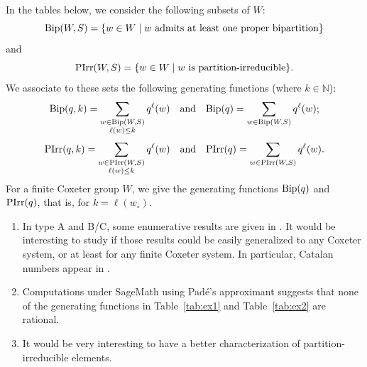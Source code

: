 \documentclass[Unicode]{cedram-alco}
\theoremstyle{definition}
\begin{document}
In the tables below, we consider the following subsets of $W$:
\newcommand{\bip}{\textnormal{Bip}}
\newcommand{\pirr}{\textnormal{PIrr}}
$$
\bip(W,S)=\{w\in W\mid w\textrm{ admits at least one proper bipartition}\}
$$
and
$$
 \pirr(W,S)=\{w\in W\mid w\textrm{ is partition-irreducible}\}.
$$
We associate to these sets the following generating functions (where $k\in\mathbb N$):
$$
\bip(q,k)=\sum_{\substack{w\in \bip(W,S)\\ \ell(w)\leq k}} q^\ell(w)\quad\textrm{and}\quad\bip(q)=\sum_{w\in \bip(W,S)} q^\ell(w);
$$
$$
\pirr(q,k)=\sum_{\substack{w\in \pirr(W,S)\\ \ell(w)\leq k}} q^\ell(w)\quad\textrm{and}\quad \pirr(q)=\sum_{w\in \pirr(W,S)} q^\ell(w).
$$
For a finite Coxeter group $W$, we give the generating functions $\bip(q)$ and $ \pirr(q)$, that is, for $k=\ell(w_\circ)$. 

\begin{remarks}
\begin{enumerate}
\item In type A and B/C, some enumerative results are given in \cite[\S6]{DeDiRo17}. It would be interesting to study if those results could be easily generalized to any Coxeter system, or at least for any finite Coxeter system. In particular, Catalan numbers appear in  \cite[Lemma 6.1]{DeDiRo17}. 
\item Computations under SageMath using Pad\'e's approximant suggests that none of the generating functions in Table~\ref{tab:ex1} and Table~\ref{tab:ex2} are rational.
\item It would be very interesting to have a better characterization of partition-irreducible elements. 
\end{enumerate}
\end{remarks}
\end{document}
